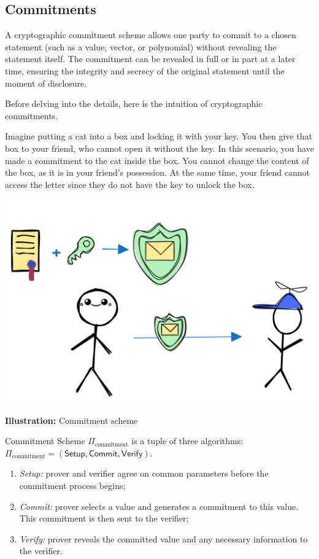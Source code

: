 \documentclass[../lecture-notes.tex]{subfiles}
\begin{document}
\subsection{Commitments}

\begin{definition}
    A cryptographic commitment scheme allows one party to commit to a chosen statement (such as a value, vector, or polynomial) without revealing the statement itself. The commitment can be revealed in full or in part at a later time, ensuring the integrity and secrecy of the original statement until the moment of disclosure.
\end{definition}

Before delving into the details, here is the intuition of cryptographic commitments.

Imagine putting a cat into a box and locking it with your key. 
You then give that box to your friend, who cannot open it without the key.
In this scenario, you have made a commitment to the cat inside the box. 
You cannot change the content of the box, as it is in your friend's possession. 
At the same time, your friend cannot access the letter since they do not have the key to unlock the box.

\begin{center}
    \centering\includegraphics[width=0.5\linewidth, clip]{images/lecture_5/CommitmentExample.png}

    \scriptsize{\textbf{Illustration:} Commitment scheme}
\end{center}

\begin{definition}
    
    Commitment Scheme $\Pi_{\text{commitment}}$ is a tuple of three algorithms: $\Pi_{\text{commitment}} = (\mathsf{Setup}, \mathsf{Commit}, \mathsf{Verify})$.

    \begin{enumerate}

        \item \textit{Setup:}  prover and verifier agree on common parameters before the commitment process begins;

        \item \textit{Commit:} prover selects a value and generates a commitment to this value. This commitment is then sent to the verifier;

        \item  \textit{Verify:} prover reveals the committed value and any necessary information to the verifier. 
    \end{enumerate}
\end{definition}
\end{document}
